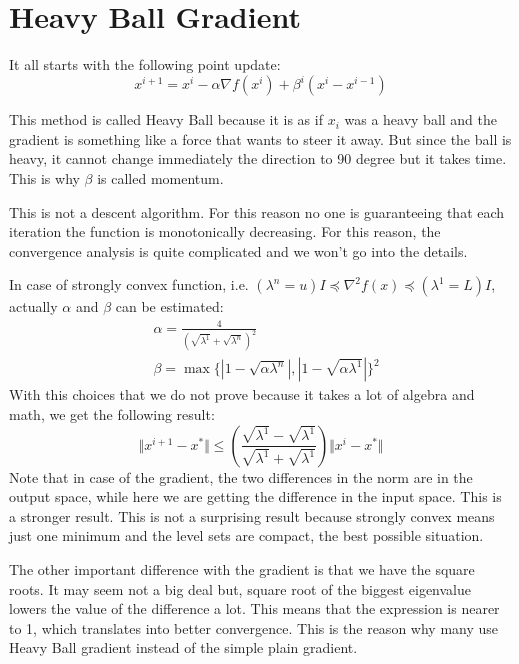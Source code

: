 \section{Heavy Ball Gradient}
\par It all starts with the following point update:
\begin{equation}
    x^{i+1} = x^i - \alpha \nabla f(x^i) + \beta^i (x^i - x^{i-1})
\end{equation}
\par This method is called Heavy Ball because it is as if $x_i$ was a heavy ball and the gradient is something like a force that wants to steer it away. But since the ball is heavy, it cannot change immediately the direction to 90 degree but it takes time. This is why $\beta$ is called momentum.
\par This is not a descent algorithm. For this reason no one is guaranteeing that each iteration the function is monotonically decreasing. For this reason, the convergence analysis is quite complicated and we won't go into the details.
\par In case of strongly convex function, i.e. $(\lambda^n = u) I \preceq \nabla^2 f(x) \preceq (\lambda^1 = L) I$, actually $\alpha$ and $\beta$ can be estimated:
\begin{align}
    &\alpha = \frac{4}{(\sqrt{\lambda^1} + \sqrt{\lambda^n})^2}\\
    &\beta = \max\{|1-\sqrt{\alpha \lambda^n}|,|1-\sqrt{\alpha \lambda^1}|\}^2
\end{align}
With this choices that we do not prove because it takes a lot of algebra and math, we get the following result:
\begin{equation}
    \Vert x^{i+1} - x^* \Vert \leq (\frac{\sqrt{\lambda^1} - \sqrt{\lambda^1}}{\sqrt{\lambda^1} + \sqrt{\lambda^1}}) \Vert x^{i} - x^* \Vert
\end{equation}
Note that in case of the gradient, the two differences in the norm are in the output space, while here we are getting the difference in the input space. This is a stronger result. This is not a surprising result because strongly convex means just one minimum and the level sets are compact, the best possible situation.
\par The other important difference with the gradient is that we have the square roots. It may seem not a big deal but, square root of the biggest eigenvalue lowers the value of the difference a lot. This means that the expression is nearer to 1, which translates into better convergence. This is the reason why many use Heavy Ball gradient instead of the simple plain gradient.
%
%
%
